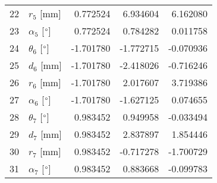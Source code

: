 \documentclass{standalone}%
\begin{document}
\begin{tabular}{llrrr}
22 &              $r_{5}$ [mm] &  0.772524 &   6.934604 &   6.162080 \\
23 &  $\alpha_{5}$ [$\degree$] &  0.772524 &   0.784282 &   0.011758 \\
24 &  $\theta_{6}$ [$\degree$] & -1.701780 &  -1.772715 &  -0.070936 \\
25 &              $d_{6}$ [mm] & -1.701780 &  -2.418026 &  -0.716246 \\
26 &              $r_{6}$ [mm] & -1.701780 &   2.017607 &   3.719386 \\
27 &  $\alpha_{6}$ [$\degree$] & -1.701780 &  -1.627125 &   0.074655 \\
28 &  $\theta_{7}$ [$\degree$] &  0.983452 &   0.949958 &  -0.033494 \\
29 &              $d_{7}$ [mm] &  0.983452 &   2.837897 &   1.854446 \\
30 &              $r_{7}$ [mm] &  0.983452 &  -0.717278 &  -1.700729 \\
31 &  $\alpha_{7}$ [$\degree$] &  0.983452 &   0.883668 &  -0.099783 \\
\bottomrule
\end{tabular}
%
\end{document}
